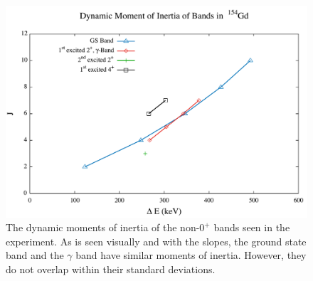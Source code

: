 \begin{figure}[!]
    \centering
    \includegraphics[scale=0.45]{Discussion/154_Dynamic.pdf}
    \caption{The dynamic moments of inertia of the non-$0^+$ bands seen in the experiment. As is seen visually and with the slopes, the ground state band and the $\gamma$ band have similar moments of inertia. However, they do not overlap within their standard deviations.}
    \label{fig:154_Dynamic}
\end{figure}
